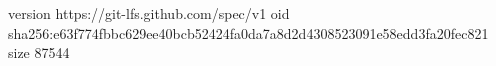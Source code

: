 version https://git-lfs.github.com/spec/v1
oid sha256:e63f774fbbc629ee40bcb52424fa0da7a8d2d4308523091e58edd3fa20fec821
size 87544
